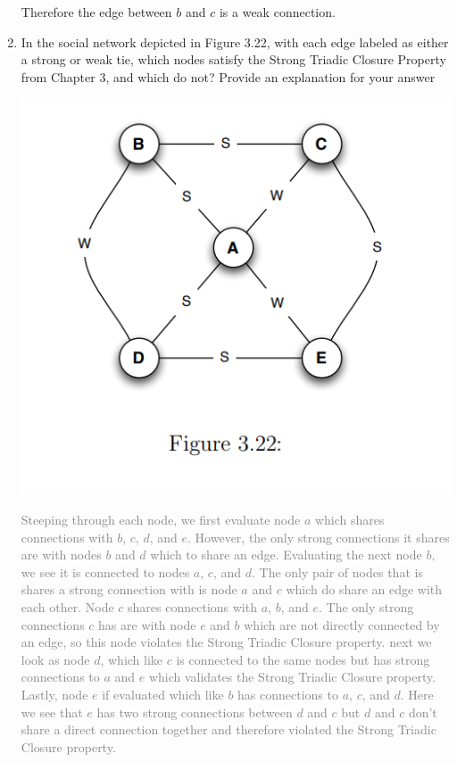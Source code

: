 \documentclass[11pt]{article}
\begin{document}
\begin{enumerate}
{\begin{center}
\end{center}
Therefore the edge between $b$ and $c$ is a weak connection.\\
}
\item  In the social network depicted in Figure 3.22, with each edge labeled as either a strong or weak tie, which nodes satisfy the Strong Triadic Closure Property from Chapter 3, and which do not? Provide an explanation for your answer
\begin{center}
	\includegraphics[scale=0.6]{Figure_3_22}
\end{center}
\textcolor{gray}{
Steeping through each node, we first evaluate node $a$ which shares connections with $b$, $c$, $d$, and $e$.  However, the only strong connections it shares are with nodes $b$ and $d$ which to share an edge.  Evaluating the next node $b$, we see it is connected to nodes $a$, $c$, and $d$.  The only pair of nodes that is shares a strong connection with is node $a$ and $c$ which do share an edge with each other. Node $c$ shares connections with $a$, $b$, and $e$.  The only strong connections $c$ has are with node $e$ and $b$ which are not directly connected by an edge, so this node violates the Strong Triadic Closure property. next we look as node $d$, which like $c$ is connected to the same nodes but has strong connections to $a$ and $e$ which validates the Strong Triadic Closure property. Lastly, node $e$ if evaluated which like $b$ has connections to $a$, $c$, and $d$.  Here we see that $e$ has two strong connections between $d$ and $c$ but $d$ and $c$ don't share a direct connection together and therefore violated the Strong Triadic Closure property.\\
}
\end{enumerate}
\end{document}
